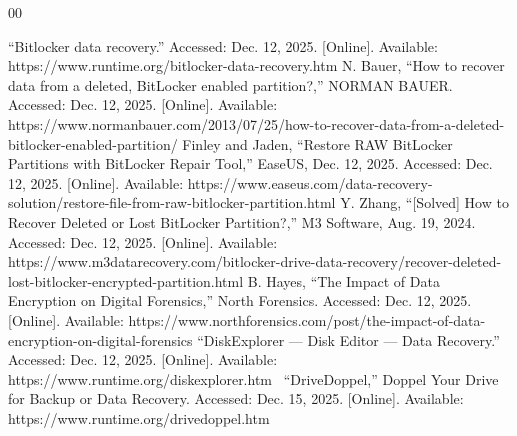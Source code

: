 \documentclass[conference]{IEEEtran} \IEEEoverridecommandlockouts
\begin{document}
\begin{thebibliography}{00} \raggedright 
	 “Bitlocker data
	recovery.” Accessed: Dec. 12, 2025. [Online]. Available:
	https://www.runtime.org/bitlocker-data-recovery.htm 
	 N.
	Bauer, “How to recover data from a deleted, BitLocker enabled
	partition?,” NORMAN BAUER. Accessed: Dec. 12, 2025. [Online].
	Available:
	https://www.normanbauer.com/2013/07/25/how-to-recover-data-from-a-deleted-bitlocker-enabled-partition/
	 Finley and Jaden, “Restore RAW BitLocker Partitions with
	BitLocker Repair Tool,” EaseUS, Dec. 12, 2025. Accessed: Dec. 12, 2025.
	[Online]. Available:
	https://www.easeus.com/data-recovery-solution/restore-file-from-raw-bitlocker-partition.html
	 Y. Zhang, “[Solved] How to Recover Deleted or Lost
	BitLocker Partition?,” M3 Software, Aug. 19, 2024. Accessed: Dec. 12,
	2025. [Online]. Available:
	https://www.m3datarecovery.com/bitlocker-drive-data-recovery/recover-deleted-lost-bitlocker-encrypted-partition.html
	 B. Hayes, “The Impact of Data Encryption on Digital
	Forensics,” North Forensics. Accessed: Dec. 12, 2025. [Online].
	Available:
	https://www.northforensics.com/post/the-impact-of-data-encryption-on-digital-forensics
	 “DiskExplorer — Disk Editor — Data Recovery.” Accessed:
	Dec. 12, 2025. [Online]. Available:
	https://www.runtime.org/diskexplorer.htm\ 
	 “DriveDoppel,” Doppel Your Drive for Backup or Data Recovery. Accessed: Dec. 15, 2025. [Online]. Available: https://www.runtime.org/drivedoppel.htm
  




\end{thebibliography}

	\vspace{12pt}

	
\end{document}
